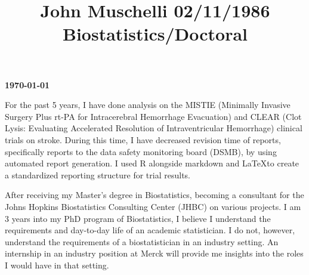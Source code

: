 \documentclass[12pt]{article}
\title{John Muschelli  \hfill 02/11/1986 \hfill Biostatistics/Doctoral} %
\newcommand{\company}{{Merck }}
\begin{document}
\newbox\TempBox \newbox\TempBoxA
%
\def\undertilde#1{%
  \ifmmode\setbox\TempBox=\hbox{$#1$}\else\setbox\TempBox=\hbox{#1}\fi%
  \setbox\TempBoxA=\hbox to \wd\TempBox{\hss\char'176\hss}%
  \rlap{\copy\TempBox}\smash{\lower9pt\hbox{\copy\TempBoxA}}%
}
%
\def\undertildelow#1{%
  \ifmmode\setbox\TempBox=\hbox{$#1$}\else\setbox\TempBox=\hbox{#1}\fi%
  \setbox\TempBoxA=\hbox to \wd\TempBox{\hss\char'176\hss}%
  \rlap{\copy\TempBox}\smash{\lower10pt\hbox{\copy\TempBoxA}}%
}




\hfill {\bf \today\\}

\doublespacing
For the past 5 years, I have done analysis on the MISTIE (Minimally Invasive Surgery Plus rt-PA for Intracerebral Hemorrhage Evacuation) and CLEAR (Clot Lysis: Evaluating Accelerated Resolution of Intraventricular Hemorrhage) clinical trials on stroke.  During this time, I have decreased revision time of reports, specifically reports to the data safety monitoring board (DSMB), by using automated report generation.  I used R alongside markdown and \LaTeX to create a standardized reporting structure for trial results.   

After receiving my Master's degree in Biostatistics, becoming a consultant for the Johns Hopkins Biostatistics Consulting Center (JHBC) on various projects.  I am 3 years into my PhD program of Biostatistics, I believe I understand the requirements and day-to-day life of an academic statistician.  I do not, however, understand the requirements of a biostatistician in an industry setting.  An internship in an industry position at \company will provide me insights into the roles I would have in that setting.
\end{document}
